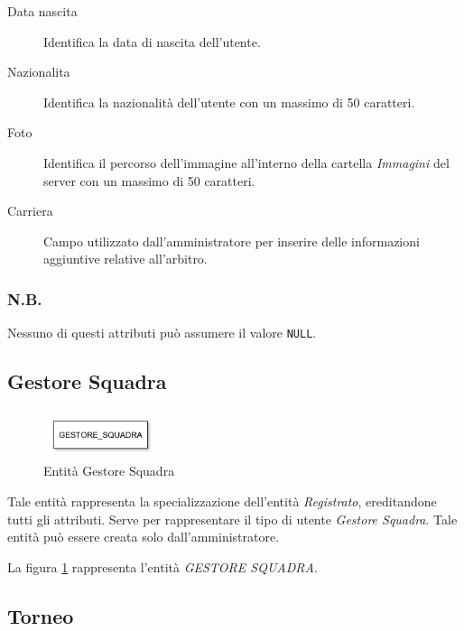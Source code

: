 		\begin{description}
			
			\item[Data nascita]
			Identifica la data di nascita dell'utente.
			
			\item[Nazionalita]
			Identifica la nazionalità dell'utente con un massimo di 50 caratteri.
			
			\item[Foto]
			Identifica il percorso dell'immagine all'interno della cartella \emph{Immagini} del server con un massimo di 50 caratteri.
			
			\item[Carriera]
			Campo utilizzato dall'amministratore per inserire delle informazioni aggiuntive relative all'arbitro.
			
		\end{description}
		
		\subsubsection*{N.B.}
		Nessuno di questi attributi può assumere il valore \texttt{NULL}.
	
	\subsection{Gestore Squadra}
	
		\begin{figure}[h]
			\centering
			\includegraphics[width=0.3\textwidth]
			{immagini/05-gestore-squadra}
			
			\caption{Entità Gestore Squadra}
			\label{entita-gestore-squadra}
		\end{figure}
		
		Tale entità rappresenta la specializzazione dell'entità \emph{Registrato}, ereditandone tutti gli attributi. Serve per rappresentare il tipo di utente \emph{Gestore Squadra}. Tale entità può essere creata solo dall'amministratore.
		
		La figura \ref{entita-gestore-squadra} rappresenta l'entità \emph{GESTORE SQUADRA}.
	
	\subsection{Torneo}
	
